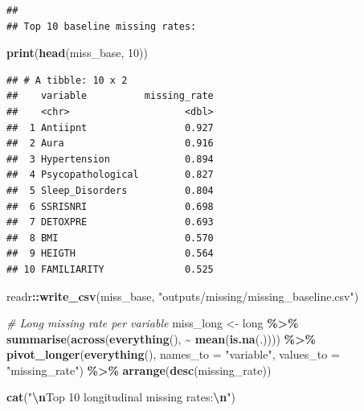 \documentclass[
]{article}
\newenvironment{Shaded}{\begin{snugshade}}{\end{snugshade}}
\newcommand{\AttributeTok}[1]{\textcolor[rgb]{0.13,0.29,0.53}{#1}}
\newcommand{\CommentTok}[1]{\textcolor[rgb]{0.56,0.35,0.01}{\textit{#1}}}
\newcommand{\DecValTok}[1]{\textcolor[rgb]{0.00,0.00,0.81}{#1}}
\newcommand{\FunctionTok}[1]{\textcolor[rgb]{0.13,0.29,0.53}{\textbf{#1}}}
\newcommand{\NormalTok}[1]{#1}
\newcommand{\OtherTok}[1]{\textcolor[rgb]{0.56,0.35,0.01}{#1}}
\newcommand{\SpecialCharTok}[1]{\textcolor[rgb]{0.81,0.36,0.00}{\textbf{#1}}}
\newcommand{\StringTok}[1]{\textcolor[rgb]{0.31,0.60,0.02}{#1}}
\begin{document}
\begin{verbatim}
## 
## Top 10 baseline missing rates:
\end{verbatim}

\begin{Shaded}
\begin{Highlighting}[]
\FunctionTok{print}\NormalTok{(}\FunctionTok{head}\NormalTok{(miss\_base, }\DecValTok{10}\NormalTok{))}
\end{Highlighting}
\end{Shaded}

\begin{verbatim}
## # A tibble: 10 x 2
##    variable          missing_rate
##    <chr>                    <dbl>
##  1 Antiipnt                 0.927
##  2 Aura                     0.916
##  3 Hypertension             0.894
##  4 Psycopathological        0.827
##  5 Sleep_Disorders          0.804
##  6 SSRISNRI                 0.698
##  7 DETOXPRE                 0.693
##  8 BMI                      0.570
##  9 HEIGTH                   0.564
## 10 FAMILIARITY              0.525
\end{verbatim}

\begin{Shaded}
\begin{Highlighting}[]
\NormalTok{readr}\SpecialCharTok{::}\FunctionTok{write\_csv}\NormalTok{(miss\_base, }\StringTok{"outputs/missing/missing\_baseline.csv"}\NormalTok{)}

\CommentTok{\# Long missing rate per variable}
\NormalTok{miss\_long }\OtherTok{\textless{}{-}}\NormalTok{ long }\SpecialCharTok{\%\textgreater{}\%}
  \FunctionTok{summarise}\NormalTok{(}\FunctionTok{across}\NormalTok{(}\FunctionTok{everything}\NormalTok{(), }\SpecialCharTok{\textasciitilde{}} \FunctionTok{mean}\NormalTok{(}\FunctionTok{is.na}\NormalTok{(.)))) }\SpecialCharTok{\%\textgreater{}\%}
  \FunctionTok{pivot\_longer}\NormalTok{(}\FunctionTok{everything}\NormalTok{(), }\AttributeTok{names\_to =} \StringTok{"variable"}\NormalTok{, }\AttributeTok{values\_to =} \StringTok{"missing\_rate"}\NormalTok{) }\SpecialCharTok{\%\textgreater{}\%}
  \FunctionTok{arrange}\NormalTok{(}\FunctionTok{desc}\NormalTok{(missing\_rate))}

\FunctionTok{cat}\NormalTok{(}\StringTok{"}\SpecialCharTok{\textbackslash{}n}\StringTok{Top 10 longitudinal missing rates:}\SpecialCharTok{\textbackslash{}n}\StringTok{"}\NormalTok{)}
\end{Highlighting}
\end{Shaded}
\end{document}
